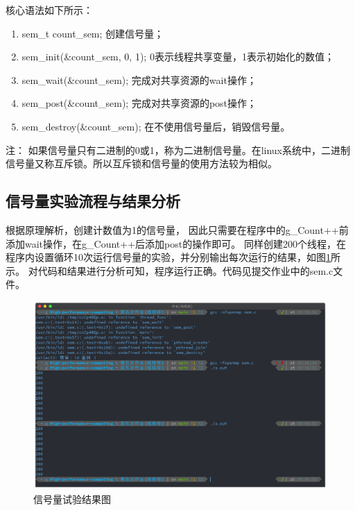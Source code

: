 \documentclass[11pt]{ctexart}
\newenvironment{note}{\kaishu 注：}{}
\begin{document}
核心语法如下所示：
\begin{enumerate}
    \item {\ttfamily sem\_t count\_sem;} 创建信号量；
    \item {\ttfamily sem\_init(\&count\_sem, 0, 1);} 0表示线程共享变量，1表示初始化的数值；
    \item {\ttfamily sem\_wait(\&count\_sem);} 完成对共享资源的{\ttfamily wait}操作；
    \item {\ttfamily sem\_post(\&count\_sem);} 完成对共享资源的{\ttfamily post}操作；
    \item {\ttfamily sem\_destroy(\&count\_sem);} 在不使用信号量后，销毁信号量。
\end{enumerate}

\begin{note}
    如果信号量只有二进制的0或1，称为二进制信号量。在linux系统中，二进制信号量又称互斥锁。所以互斥锁和信号量的使用方法较为相似。
\end{note}

\subsection{信号量实验流程与结果分析}
根据原理解析，创建计数值为1的信号量，
因此只需要在程序中的{\ttfamily g\_Count++}前添加{\ttfamily wait}操作，在{\ttfamily g\_Count++}后添加{\ttfamily post}的操作即可。
同样创建200个线程，在程序内设置循环10次运行信号量的实验，并分别输出每次运行的结果，如图\ref{sem}所示。
对代码和结果进行分析可知，程序运行正确。代码见提交作业中的{\ttfamily sem.c}文件。
 
\begin{figure}[ht]
    \centering
    \includegraphics[scale=0.35]{../sem.png}
    \caption{信号量试验结果图}
    \label{sem}
\end{figure}
\end{document}
